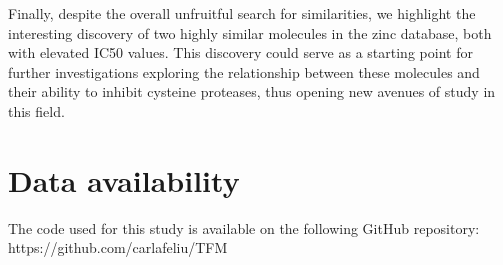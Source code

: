 \documentclass[final,times,twocolumn,article]{elsarticle}
\begin{document}
Finally, despite the overall unfruitful search for similarities, we highlight the interesting discovery of two highly similar molecules in the zinc database, both with elevated IC50 values. This discovery could serve as a starting point for further investigations exploring the relationship between these molecules and their ability to inhibit cysteine proteases, thus opening new avenues of study in this field.


\appendix

\section{Data availability}

The code used for this study is available on the following GitHub repository: https://github.com/carlafeliu/TFM


\end{document}
